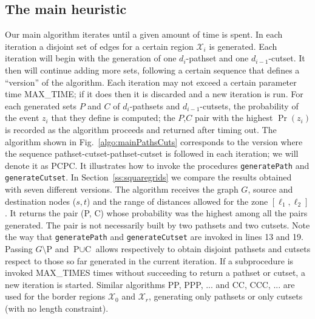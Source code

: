 \documentclass[a4paper]{article}
\newcommand{\ele}{{\ell}}
\begin{document}
\subsection{The main heuristic}

Our main algorithm iterates until a given amount of time is spent. In each iteration a disjoint set of edges for a certain region ${\mathcal X}_i$ is generated. Each iteration will begin with the generation of one $d_i$-pathset and one $d_{i-1}$-cutset. It then will continue adding more sets, following a certain sequence that defines a ``version'' of the algorithm. Each iteration may not exceed a certain parameter time MAX\_TIME; if it does then it is discarded and a new iteration is run. For each generated sets $P$ and $C$ of $d_i$-pathsets and $d_{i-1}$-cutsets, the probability of the event $z_i$ that they define is computed; the $P$,$C$ pair with the highest $\Pr(z_i)$ is recorded as the algorithm proceeds and returned after timing out. The algorithm shown in Fig.~\ref{algo:mainPathsCuts} corresponds to the version where the sequence pathset-cutset-pathset-cutset is followed in each iteration; we will denote it as PCPC. It illustrates how to invoke the procedures {\tt generatePath} and {\tt generateCutset}. In Section~\ref{ss:squaregrids} we compare the results obtained with seven different versions. The algorithm receives the graph $G$, source and destination nodes ($s,t$) and the range of distances allowed for the zone $[\ele_1,\ele_2]$. It returns the pair (P, C) whose probability was the highest among all the pairs generated. The pair is not necessarily built by two pathsets and two cutsets. Note the way that {\tt generatePath} and {\tt generateCutset} are invoked in lines 13 and 19. Passing $G\setminus \text{P}$ and $\text{P}\cup \text{C}$ allows respectively to obtain disjoint pathsets and cutsets respect to those so far generated in the current iteration. If a subprocedure is invoked MAX\_TIMES times without succeeding to return a pathset or cutset, a new iteration is started. Similar algorithms PP, PPP, ... and CC, CCC, ... are used for the border regions ${\mathcal X}_0$ and ${\mathcal X}_r$, generating only pathsets or only cutsets (with no length constraint).
\end{document}
